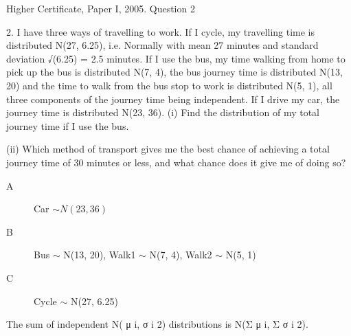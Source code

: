 \documentclass[a4paper,12pt]{article}
\begin{document}
Higher Certificate, Paper I, 2005. Question 2
\begin{framed}
2. I have three ways of travelling to work. If I cycle, my travelling time is distributed
N(27, 6.25), i.e. Normally with mean 27 minutes and standard deviation √(6.25) = 2.5
minutes. If I use the bus, my time walking from home to pick up the bus is distributed
N(7, 4), the bus journey time is distributed N(13, 20) and the time to walk from the
bus stop to work is distributed N(5, 1), all three components of the journey time being
independent. If I drive my car, the journey time is distributed N(23, 36).
(i) Find the distribution of my total journey time if I use the bus.
\end{framed}
\begin{framed}
(ii) Which method of transport gives me the best chance of achieving a total
journey time of 30 minutes or less, and what chance does it give me of doing
so?
\end{framed}

\begin{description}
\item[A] Car $\sim N(23, 36)$
\item[B] Bus $\sim$ N(13, 20), Walk1 $\sim$ N(7, 4), Walk2 $\sim$ N(5, 1)
\item[C] Cycle $\sim$ N(27, 6.25)
\end{description}


The sum of independent N( μ
i, σ
i 2) distributions is N(Σ μ
i, Σ σ
i 2).
\end{document}
